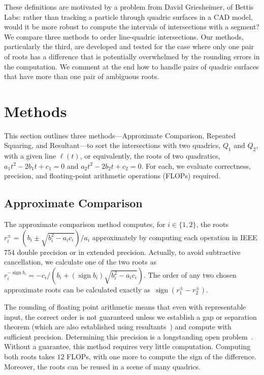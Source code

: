 \documentclass{cccg16}
\DeclareMathOperator{\sign}{sign}
\begin{document}
These definitions are motivated by a problem from David Griesheimer,
of Bettis Labs: rather than tracking a particle through quadric
surfaces in a CAD model, would it be more robust to compute the
intervals of intersections with a segment?  We compare three methods
to order line-quadric intersections.  Our methods, particularly the
third, are  developed and tested for the case where only
one pair of roots has a difference that is potentially overwhelmed by
the rounding errors in the computation. We comment at the end how to
handle pairs of quadric surfaces that have more than one pair of
ambiguous roots.

\section{Methods}
This section outlines three methods---Approximate Comparison, Repeated
Squaring, and Resultant---to sort the intersections with two quadrics,
$Q_1$ and $Q_2$, with a given line $\ell(t)$, or equivalently, the
roots of two quadratics, $a_1t^2-2b_1t+c_1=0$ and
$a_2t^2-2b_2t+c_2=0$.  For each, we evaluate correctness, precision,
and floating-point arithmetic operations (FLOPs) required.

\subsection{Approximate Comparison}
The approximate comparison method computes, for $i\in\{1, 2\}$, the
roots~$r_i^\pm=({b_i\pm\sqrt{b_i^2-a_ic_i}})/{a_i}$ approximately by
computing each operation in IEEE 754 double precision or in extended
precision.  Actually, to avoid subtractive cancellation, we calculate
one of the two roots as $r_i^{-\sign
  b_i}=-c_i/({b_i+(\sign{b_i})\sqrt{b_i^2-a_ic_i}})$.  The order of
any two chosen approximate roots can be calculated exactly
as~$\sign(r_1^\pm-r_2^\pm)$.

The rounding of floating point arithmetic means that even with
representable input, the correct order is not guaranteed unless we
establish a gap or separation theorem (which are also established
using resultants~\cite{brownawell2009lower,emiris2010dmm}) and compute
with sufficient precision. Determining this precision is a
longstanding open problem~\cite{demaine33open}.  Without a guarantee,
this method requires very little computation.  Computing both roots
takes $12$ FLOPs, with one more to compute the sign of the difference.
Moreover, the roots can be reused in a scene of many quadrics.
\end{document}
